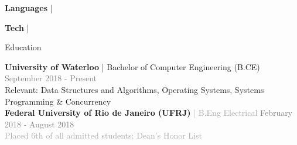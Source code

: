 \documentclass[hidelinks]{resume} %
\begin{document}
\vspace{-.1cm}
\begin{rSubsection}{\textbf{Languages} | }{}{}

\end{rSubsection}
\vspace{-.2cm}
\begin{rSubsection}{\textbf{Tech} | }{}{}

\end{rSubsection}

\vspace{-.20cm}

\begin{rSection}{Education}

{\textbf{University of Waterloo} {| Bachelor of Computer Engineering (B.CE)}} \hfill {\textcolor{gray}{September 2018 - Present}} 
\\ {Relevant: Data Structures and Algorithms, Operating Systems, Systems Programming \& Concurrency}
\vspace{5px}
\\{\textbf{Federal University of Rio de Janeiro (UFRJ)} \textcolor{darkgray}{| B.Eng Electrical}} \hfill {\textcolor{gray}{February 2018 - August 2018}} 
\\ \textcolor{darkgray}{ Placed 6th of all admitted students; Dean's Honor List}\hfill
\vspace{.1cm}
\end{rSection}

\vspace{-.10cm}
\end{document}
